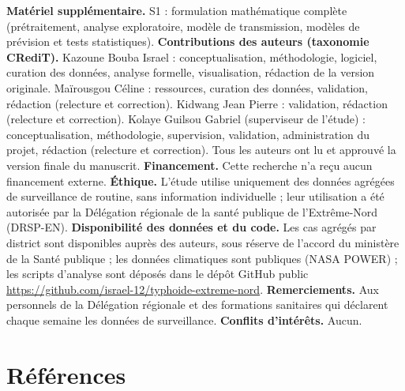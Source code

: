 \documentclass[11pt]{article}
\begin{document}
\textbf{Matériel supplémentaire.} S1 : formulation mathématique complète (prétraitement, analyse exploratoire, modèle de transmission, modèles de prévision et tests statistiques).
\textbf{Contributions des auteurs (taxonomie CRediT).} Kazoune Bouba Israel : conceptualisation, méthodologie, logiciel, curation des données, analyse formelle, visualisation, rédaction de la version originale. Maïrousgou Céline : ressources, curation des données, validation, rédaction (relecture et correction). Kidwang Jean Pierre : validation, rédaction (relecture et correction). Kolaye Guilsou Gabriel (superviseur de l'étude) : conceptualisation, méthodologie, supervision, validation, administration du projet, rédaction (relecture et correction). Tous les auteurs ont lu et approuvé la version finale du manuscrit.
\textbf{Financement.} Cette recherche n'a reçu aucun financement externe.
\textbf{Éthique.} L'étude utilise uniquement des données agrégées de surveillance de routine, sans information individuelle ; leur utilisation a été autorisée par la Délégation régionale de la santé publique de l'Extrême-Nord (DRSP-EN).
\textbf{Disponibilité des données et du code.} Les cas agrégés par district sont disponibles auprès des auteurs, sous réserve de l'accord du ministère de la Santé publique ; les données climatiques sont publiques (NASA POWER) ; les scripts d'analyse sont déposés dans le dépôt GitHub public \url{https://github.com/israel-12/typhoide-extreme-nord}.
\textbf{Remerciements.} Aux personnels de la Délégation régionale et des formations sanitaires qui déclarent chaque semaine les données de surveillance.
\textbf{Conflits d'intérêts.} Aucun.

\section*{Références}
\end{document}

